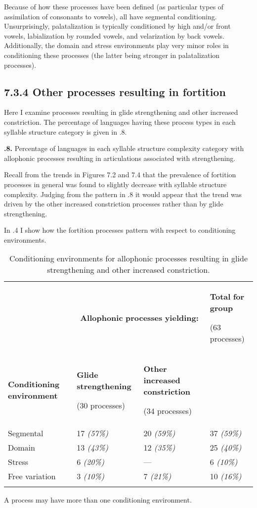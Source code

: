   Because of how these processes have been defined (as particular types of assimilation of consonants to vowels), all have segmental conditioning. Unsurprisingly, palatalization is typically conditioned by high and/or front vowels, labialization by rounded vowels, and velarization by back vowels. Additionally, the domain and stress environments play very minor roles in conditioning these processes (the latter being stronger in palatalization processes).

\subsection{7.3.4 Other processes resulting in fortition}

  Here I examine processes resulting in glide strengthening and other increased constriction. The percentage of languages having these process types in each syllable structure category is given in .8.

\textbf{.8.} Percentage of languages in each syllable structure complexity category with allophonic processes resulting in articulations associated with strengthening.

  Recall from the trends in Figures 7.2 and 7.4 that the prevalence of fortition processes in general was found to slightly decrease with syllable structure complexity. Judging from the pattern in .8 it would appear that the trend was driven by the other increased constriction processes rather than by glide strengthening.

  In .4 I show how the fortition processes pattern with respect to conditioning environments.

\begin{table}
\begin{tabularx}{\textwidth}{XXXX}
\lsptoprule
 & \multicolumn{2}{c}{ \textbf{Allophonic} \textbf{processes} \textbf{yielding:}} & { \textbf{Total} \textbf{for} \textbf{group}}

 (63 processes)\\
 \textbf{Conditioning} \textbf{environment} & { \textbf{Glide} \textbf{strengthening}}

 (30 processes) & { \textbf{Other} \textbf{increased} \textbf{constriction}}

 (34 processes) & \\
 Segmental & 17 \textit{(57\%)} & 20 \textit{(59\%)} & 37 \textit{(59\%)}\\
 Domain & 13 \textit{(43\%)} & 12 \textit{(35\%)} & 25 \textit{(40\%)}\\
 Stress & 6 \textit{(20\%)} & — & 6 \textit{(10\%)}\\
 Free variation & 3 \textit{(10\%)} & 7 \textit{(21\%)} & 10 \textit{(16\%)}\\
\lspbottomrule
\end{tabularx}
\caption{\label{7.4}Conditioning environments for allophonic processes resulting in glide strengthening and other increased constriction.}A process may have more than one conditioning environment.
\end{table}

